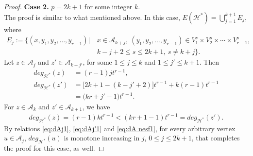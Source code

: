 \documentclass[12pt,a4paper]{article}
\begin{document}
\begin{proof}
	
	\textbf{Case  2.} $ p=2k+1 $ for some integer $ k $.\\
	The proof is similar to what mentioned above.
	In this case, $ E(\mathcal{H}^*)=\bigcup_{j=1}^{k+1}E_j $, where
	\begin{align*}
	E_j:=\bigg\{ (x, y_1, y_2,\ldots, y_{r-1}) \big|\  &x\in \mathcal{A}_{k+j},\  (y_1,y_2,\ldots, y_{r-1})\in V^s_{1}\times V^s_{2}\times \cdots\times V^s_{r-1},\\
	& k-j+2\leq s\leq 2k+1,\ s\neq k+j
	\bigg\}.
	\end{align*}
	Let $ z\in \mathcal{A}_{j} $ and $ z'\in \mathcal{A}_{k+j'} $, for some $ 1\leq j\leq k $ and $ 1\leq j'\leq k+1 $. Then
	\begin{align}
	deg_{\mathcal{H}^*}(z)&=(r-1)jt^{r-1},\label{eq:dAj1}\\
	deg_{\mathcal{H}^*}(z')&=
	\big[2k+1-(
	k-j'+2
	)\big]t^{r-1}
	+
	k
	(r-1)t^{r-1}\nonumber\\
	&=\big(kr+j'-1\big)t^{r-1}.\label{eq:dAj'1}
	\end{align}
	For $ z\in \mathcal{A}_k $ and $ z'\in \mathcal{A}_{k+1} $, we have
	\begin{align}\label{eq:dA nesf1}
	deg_{\mathcal{H}^*}(z)=(r-1)kt^{r-1}<(kr+1-1)t^{r-1}=deg_{\mathcal{H}^*}(z').
	\end{align}
	By relations
	\eqref{eq:dAj1}, \eqref{eq:dAj'1} and \eqref{eq:dA nesf1},
	for every arbitrary vertex $ u\in \mathcal{A}_j $, $ deg_{\mathcal{H}^*}(u) $ is monotone increasing in $ j $, $ 0\leq j \leq 2k+1 $, that completes the proof for this case, as well.
\end{proof}
\end{document}
